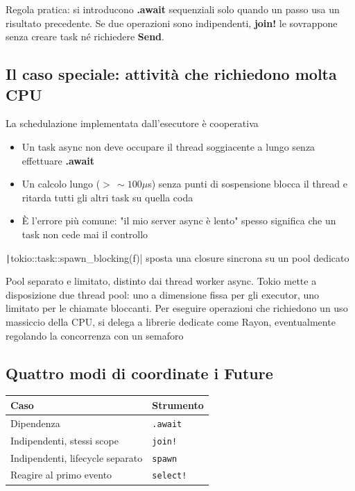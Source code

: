 Regola pratica: si introducono \textbf{.await} sequenziali solo quando un passo usa un
risultato precedente.
Se due operazioni sono indipendenti, \textbf{join!} le sovrappone senza creare task né richiedere
\textbf{Send}.

\subsection{Il caso speciale: attività che richiedono molta CPU}

La schedulazione implementata dall'esecutore è cooperativa

\begin{itemize}
  \item Un task async non deve occupare il thread soggiacente a lungo senza effettuare \textbf{.await}
  \item Un calcolo lungo ($>\,\sim 100\mu$s) senza punti di sospensione blocca il thread e ritarda tutti gli altri task su
        quella coda
  \item È l'errore più comune: "il mio server async è lento" spesso significa che un task non cede mai il
        controllo
\end{itemize}


\texttt|tokio::task::spawn_blocking(f)| sposta una closure sincrona su un pool dedicato

Pool separato e limitato, distinto dai thread worker async.
Tokio mette a disposizione due thread pool: uno a dimensione fissa per gli executor, uno limitato per
le chiamate bloccanti. Per eseguire operazioni che richiedono un uso massiccio della CPU, si delega a librerie dedicate come
Rayon, eventualmente regolando la concorrenza con un semaforo


\subsection{Quattro modi di coordinate i Future}


\begin{table}[h!]
  \renewcommand{\arraystretch}{1.6}
  \centering
  \begin{tabular}{l l}
    \toprule
    \textbf{Caso}                    & \textbf{Strumento} \\
    \midrule
    Dipendenza                       & \texttt{.await}    \\
    Indipendenti, stessi scope       & \texttt{join!}     \\
    Indipendenti, lifecycle separato & \texttt{spawn}     \\
    Reagire al primo evento          & \texttt{select!}   \\
    \bottomrule
  \end{tabular}
\end{table}

